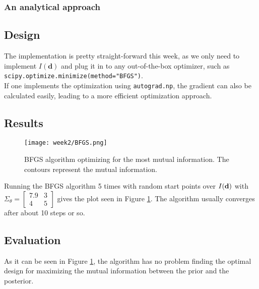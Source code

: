 \subsubsection{An analytical approach}
\subsection{Design}
The implementation is pretty straight-forward this week, as we only need to implement $I(\textbf{d})$ and plug it in to any out-of-the-box optimizer, such as \texttt{scipy.optimize.minimize(method="BFGS")}.\\
If one implements the optimization using \texttt{autograd.np}, the gradient can also be calculated easily, leading to a more efficient optimization approach.
\subsection{Results}
\begin{figure}
  \centering
  \texttt{[image: week2/BFGS.png]}
  \caption{BFGS algorithm optimizing for the most mutual information. The contours represent the mutual information.}
  \label{fig:BFGS}
\end{figure}
Running the BFGS algorithm 5 times with random start points over $I(\mathbf{d})$ with $\Sigma_\theta=\begin{bmatrix}7.9 & 3 \\ 4 & 5\end{bmatrix}$ gives the plot seen in Figure \ref{fig:BFGS}. The algorithm usually converges after about 10 steps or so.
\subsection{Evaluation}
As it can be seen in Figure \ref{fig:BFGS}, the algorithm has no problem finding the optimal design for maximizing the mutual information between the prior and the posterior.
